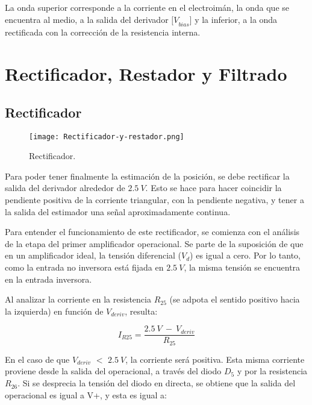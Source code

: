\noindent La onda superior corresponde a la corriente en el electroim\'{a}n, la onda que se encuentra al medio, a la salida del derivador ${[V}_{bias}$$]$ y la inferior, a la onda rectificada con la correcci\'{o}n de la resistencia interna.

\section{Rectificador, Restador y Filtrado}

\subsection{Rectificador}

\begin{figure}[H]
	\centering
	\texttt{[image: Rectificador-y-restador.png]}
	\caption{Rectificador.}
	\label{fig:img_Rectificador_y_restador}
\end{figure}

\noindent Para poder tener finalmente la estimaci\'{o}n de la posici\'{o}n, se debe rectificar la salida del derivador alrededor de $2.5\:V$. Esto se hace para hacer coincidir la pendiente positiva de la corriente triangular, con la pendiente negativa, y tener a la salida del estimador una se\~{n}al aproximadamente continua.

\noindent Para entender el funcionamiento de este rectificador, se comienza con el análisis de la etapa del primer amplificador operacional. Se parte de la suposici\'{o}n de que en un amplificador ideal, la tensi\'{o}n diferencial ($V_d$) es igual a cero. Por lo tanto, como la entrada no inversora est\'{a} fijada en $2.5\:V$, la misma tensi\'{o}n se encuentra en la entrada inversora.

\noindent Al analizar la corriente en la resistencia $R_{25}$ (se adpota el sentido positivo hacia la izquierda) en funci\'{o}n de $V_{deriv}$, resulta:

\begin{equation} \label{eq_corriente_r25}
	I_{R25}=\frac{2.5\:V\ -\ V_{deriv}}{R_{25}}
\end{equation}

\noindent En el caso de que $V_{deriv}$ $\mathrm{<}$ $2.5\:V$, la corriente ser\'{a} positiva. Esta misma corriente proviene desde la salida del operacional, a trav\'{e}s del diodo $D_5$ y por la resistencia $R_{26}$. Si se desprecia la tensi\'{o}n del diodo en directa, se obtiene que la salida del operacional es igual a V+, y esta es igual a:


